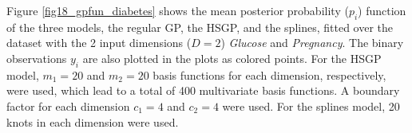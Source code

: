 \documentclass[]{interact}
\theoremstyle{plain}%
\theoremstyle{definition}
\theoremstyle{remark}
\begin{document}
Figure \ref{fig18_gpfun_diabetes} shows the mean posterior probability ($p_i$) function of the three models, the regular GP, the HSGP, and the splines, fitted over the dataset with the 2 input dimensions ($D=2$) \textit{Glucose} and \textit{Pregnancy}. The binary observations $y_i$ are also plotted in the plots as colored points. For the HSGP model, $m_1=20$ and $m_2=20$ basis functions for each dimension, respectively, were used, which lead to a total of 400 multivariate basis functions. A boundary factor for each dimension $c_1=4$ and $c_2=4$ were used. For the splines model, 20 knots in each dimension were used.
%
\begin{figure}
\centering
{}

\end{figure}
\end{document}

